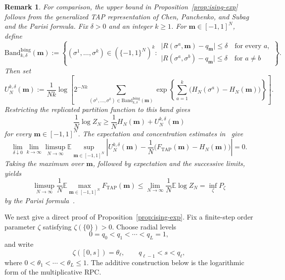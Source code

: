 \documentclass[a4paper,10pt,reqno]{amsart}
\numberwithin{equation}{section}
\newtheorem{remark}{Remark}[section]%
\newcommand{\dE}{\mathbb{E}}%
\newcommand{\Ising}{\mathrm{Ising}}
\newcommand{\TAP}{\mathrm{TAP}}
\newcommand{\Band}{\mathrm{Band}}
\newcommand{\bfm}{\mathbf{m}}
\begin{document}
	\begin{remark}
		For comparison, the upper bound in Proposition~\ref{prop:ising-exp} follows from the generalized TAP representation of Chen, Panchenko, and Subag and the Parisi formula. Fix $\delta>0$ and an integer $k\ge1$. For $\bfm\in[-1,1]^N$, define
		\[
		\Band_{k,\delta}^{\Ising}(\bfm)
		:=
		\left\{
		(\sigma^1,\ldots,\sigma^k)\in(\{-1,1\}^N)^k:
		\begin{array}{l}
			\bigl|R(\sigma^a,\bfm)-q_\bfm\bigr|\le\delta
			\quad\text{for every }a,\\
			\bigl|R(\sigma^a,\sigma^b)-q_\bfm\bigr|\le\delta
			\quad\text{for }a\ne b
		\end{array}
		\right\}.
		\]
		Then set
		\begin{equation}\label{eq:replicated-band-free-energy}
			U_N^{k,\delta}(\bfm)
			:=\frac1{Nk}\log
			\left[
			2^{-Nk}
			\sum_{(\sigma^1,\ldots,\sigma^k)
				\in\Band_{k,\delta}^{\Ising}(\bfm)}
			\exp\left\{\sum_{a=1}^k
			\bigl(H_N(\sigma^a)-H_N(\bfm)\bigr)\right\}
			\right].
		\end{equation}
		Restricting the replicated partition
		function to this band gives
		\[
		\frac1N\log Z_N
		\ge \frac1N H_N(\bfm)+U_N^{k,\delta}(\bfm)
		\]
		for every $\bfm\in[-1,1]^N$. The expectation and concentration
		estimates in~\cite[Theorem~1]{ChenPanchenkoSubag} give
		\[
		\lim_{\delta\downarrow0}\lim_{k\to\infty}
		\limsup_{N\to\infty}
		\dE\sup_{\bfm\in[-1,1]^N}
		\left|
		U_N^{k,\delta}(\bfm)
		-\frac1N\bigl(F_{\TAP}(\bfm)-H_N(\bfm)\bigr)
		\right|=0.
		\]
		Taking the maximum over $\bfm$, followed by expectation and the
		successive limits, yields
		\[
		\limsup_{N\to\infty}\frac1N
		\dE\max_{\bfm\in[-1,1]^N}F_{\TAP}(\bfm)
		\le
		\lim_{N\to\infty}\frac1N\dE\log Z_N
		=\inf_\zeta P_\zeta
		\]
		by the Parisi formula~\cite{PanchenkoBook}.
	\end{remark}
	
	We next give a direct proof of Proposition~\ref{prop:ising-exp}.
	Fix a finite-step order parameter $\zeta$ satisfying
	$\zeta(\{0\})>0$. Choose radial levels
	\[
	0=q_0<q_1<\cdots<q_L=1,
	\]
	and write
	\[
	\zeta([0,s])=\theta_\ell,
	\qquad q_{\ell-1}<s<q_\ell,
	\]
	where $0<\theta_1<\cdots<\theta_L\le1$. The additive construction below is the logarithmic form of the
	multiplicative RPC.
	
\end{document}
